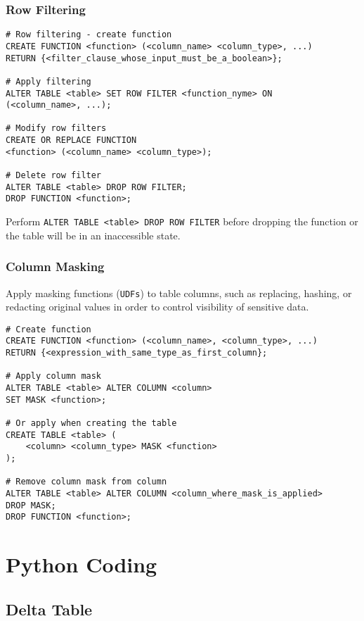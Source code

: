 \documentclass[11pt]{scrartcl}
\begin{document}
\subsubsection{Row Filtering}
\begin{lstlisting}
# Row filtering - create function
CREATE FUNCTION <function> (<column_name> <column_type>, ...)
RETURN {<filter_clause_whose_input_must_be_a_boolean>};

# Apply filtering
ALTER TABLE <table> SET ROW FILTER <function_nyme> ON
(<column_name>, ...);

# Modify row filters
CREATE OR REPLACE FUNCTION 
<function> (<column_name> <column_type>);

# Delete row filter
ALTER TABLE <table> DROP ROW FILTER;
DROP FUNCTION <function>;
\end{lstlisting}
Perform \texttt{ALTER TABLE <table> DROP ROW FILTER} before dropping the function or the table will be in an inaccessible state.

\subsubsection{Column Masking}
Apply masking functions (\texttt{UDFs}) to table columns, such as replacing, hashing, or redacting original values in order to control visibility of sensitive data.
\begin{lstlisting}
# Create function 
CREATE FUNCTION <function> (<column_name>, <column_type>, ...)
RETURN {<expression_with_same_type_as_first_column};

# Apply column mask
ALTER TABLE <table> ALTER COLUMN <column> 
SET MASK <function>;

# Or apply when creating the table
CREATE TABLE <table> (
	<column> <column_type> MASK <function>
);

# Remove column mask from column
ALTER TABLE <table> ALTER COLUMN <column_where_mask_is_applied>
DROP MASK;
DROP FUNCTION <function>;
\end{lstlisting}



\newpage
\section{Python Coding}
\subsection{Delta Table} \label{delta_table_python}
\end{document}
